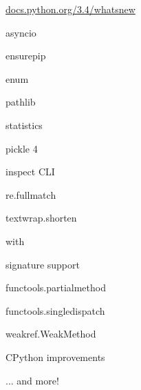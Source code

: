 \documentclass[20pt]{beamer}
\newcommand\muted[1]{{\textcolor{muted}{#1}}}
\begin{document}
\begin{center}
\begin{frame}[fragile]
    \href{http://docs.python.org/3.4/whatsnew/3.4.html}{docs.python.org/3.4/whatsnew}
    
    \bigskip

    \tiny
    \muted{asyncio}

    \muted{ensurepip}

    \muted{enum}

    \muted{pathlib}

    \muted{statistics}

    \muted{pickle 4}

    \muted{inspect CLI}

    \muted{re.fullmatch}

    \muted{textwrap.shorten}

    \muted{with}

    \muted{signature support}

    \muted{functools.partialmethod}

    \muted{functools.singledispatch}

    \muted{weakref.WeakMethod}

    \muted{CPython improvements}


    ... and more!
\end{frame}

\end{center}
\end{document}
